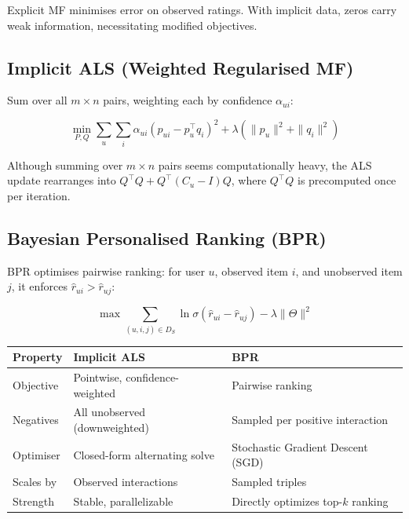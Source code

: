 \documentclass[12pt,a4paper]{article}
\begin{document}
Explicit MF minimises error on observed ratings. With implicit data, zeros carry weak information, necessitating modified objectives.

\subsection{Implicit ALS (Weighted Regularised MF)}

Sum over all $m \times n$ pairs, weighting each by confidence $\alpha_{ui}$:

\begin{equation}
\min_{P,Q} \sum_{u}\sum_{i}
  \alpha_{ui}\left(p_{ui} - p_u^{\top} q_i\right)^2
  + \lambda\left(\|p_u\|^2 + \|q_i\|^2\right)
\label{eq:m4-ials}
\end{equation}

Although summing over $m \times n$ pairs seems computationally heavy, the ALS update rearranges into $Q^{\top}Q + Q^{\top}(C_u - I)Q$, where $Q^{\top}Q$ is precomputed once per iteration.

\subsection{Bayesian Personalised Ranking (BPR)}

BPR optimises pairwise ranking: for user $u$, observed item $i$, and unobserved item $j$, it enforces $\hat{r}_{ui} > \hat{r}_{uj}$:

\begin{equation}
\max \sum_{(u,i,j) \in D_S} \ln \sigma\!\left(\hat{r}_{ui} - \hat{r}_{uj}\right) - \lambda \|\Theta\|^2
\label{eq:m4-bpr}
\end{equation}

\begin{center}
\renewcommand{\arraystretch}{1.4}
\begin{tabular}{|l|p{5.5cm}|p{6.5cm}|}
\hline
\textbf{Property} & \textbf{Implicit ALS} & \textbf{BPR} \\
\hline
Objective & Pointwise, confidence-weighted & Pairwise ranking \\
Negatives & All unobserved (downweighted) & Sampled per positive interaction \\
Optimiser & Closed-form alternating solve & Stochastic Gradient Descent (SGD) \\
Scales by & Observed interactions & Sampled triples \\
Strength & Stable, parallelizable & Directly optimizes top-$k$ ranking \\
\hline
\end{tabular}
\end{center}
\end{document}
